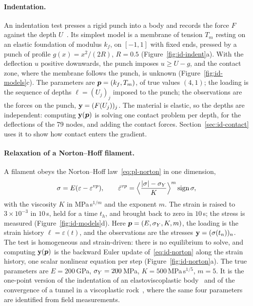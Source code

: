 \paragraph{Indentation.}
%
An indentation test presses a rigid punch into a body and records the force
$F$ against the depth $U$~\cite{TardieuConstantinescu2000,ConstantinescuTardieu2001b}.
Its simplest model is a membrane of tension $T_m$ resting on an elastic
foundation of modulus $k_f$, on $[-1,1]$ with fixed ends, pressed by a punch of
profile $g(x)=x^2/(2R)$, $R=0.5$ (Figure~\ref{fig:id-indent}a). With the
deflection $u$ positive downwards, the punch imposes $u\ge U-g$, and the
contact zone, where the membrane follows the punch, is unknown
(Figure~\ref{fig:id-models}c). The parameters are $\bm{p}=(k_f,T_m)$, of true values
$(4,1)$; the loading is the sequence of depths $\ell=(U_j)_j$ imposed to the
punch; the observations are the forces on the punch,
$\mathbf{y}=(F(U_j))_j$. The material is elastic, so the depths are independent:
computing $\mathbf{y}(\bm{p})$ is solving one contact problem per depth, for the
deflections of the 79 nodes, and adding the contact forces. Section~\ref{sec:id-contact} uses it to show how
contact enters the gradient.

\paragraph{Relaxation of a Norton--Hoff filament.}
%
A filament obeys the Norton--Hoff law~\eqref{eq:pl-norton} in one dimension,
\begin{equation}\label{eq:id-norton}
  \sigma=E(\varepsilon-\varepsilon^{vp}),\qquad
  \dot\varepsilon^{vp}=\Bigl\langle\frac{|\sigma|-\sigma_{Y}}{K}\Bigr\rangle^{m}\operatorname{sign}\sigma ,
\end{equation}
with the viscosity $K$ in MPa\,s$^{1/m}$ and the exponent $m$. The strain is
raised to $3\times10^{-3}$ in $10$\,s, held for a time $t_h$, and brought back to
zero in $10$\,s; the stress is measured (Figure~\ref{fig:id-models}d). Here
$\bm{p}=(E,\sigma_{Y},K,m)$, the loading is the strain history $\ell=\varepsilon(t)$, and
the observations are the stresses $\mathbf{y}=(\sigma(t_n))_n$. The test is
homogeneous and strain-driven: there is no equilibrium to solve, and computing
$\mathbf{y}(\bm{p})$ is the backward Euler update of~\eqref{eq:id-norton} along the
strain history, one scalar nonlinear equation per step
(Figure~\ref{fig:id-norton}a). The true
parameters are $E=200$\,GPa, $\sigma_{Y}=200$\,MPa, $K=500$\,MPa\,s$^{1/5}$, $m=5$. It
is the one-point version of the indentation of an elastoviscoplastic
body~\cite{ConstantinescuTardieu2001b} and of the convergence of a tunnel in
a viscoplastic rock~\cite{LecampionConstantinescuNguyen2002}, where the same
four parameters are identified from field measurements.

